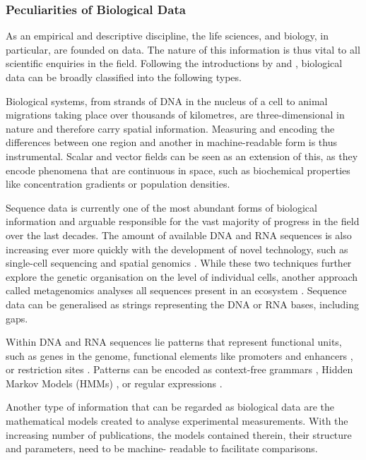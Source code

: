 \subsubsection{Peculiarities of Biological Data}\label{subsubsec:biodata}
As an empirical and descriptive discipline, the life sciences, and biology, in
particular, are founded on data. The nature of this information is thus vital
to all scientific enquiries in the field. Following the introductions by
\citet{Jagadish2003} and \citet{Wooley2006}, biological data can be broadly
classified into the following types.
\medbreak

\noindent
Biological\label{mar:dataspatial} systems, from
strands of DNA in the nucleus of a cell to animal migrations taking place over
thousands of kilometres, are three-dimensional in nature and therefore carry
spatial information. Measuring and encoding the differences between one region
and another in machine-readable form is thus instrumental. Scalar and vector
fields can be seen as an extension of this, as they encode phenomena that are
continuous in space, such as biochemical properties like concentration
gradients or population densities.
\medbreak

\noindent
Sequence data\label{mar:dataseq} is currently one of
the most abundant forms of biological information and arguable responsible for
the vast majority of progress in the field over the last decades. The amount
of available DNA and RNA sequences is also increasing ever more quickly with
the development of novel technology, such as single-cell sequencing \citep{%
Wang2015} and spatial genomics \citep{Turczyk2020}. While these two techniques
further explore the genetic organisation on the level of individual cells,
another approach called metagenomics analyses all sequences present in an
ecosystem \citep{Venter2004,Hugenholtz2008}. Sequence data can be generalised
as strings representing the DNA or RNA bases, including gaps.
\medbreak

\noindent
Within\label{mar:datapatterns} DNA and RNA sequences lie
patterns that represent functional units, such as genes in the genome,
functional elements like promoters and enhancers \citep{Kim2015a}, or
restriction sites \citep{Smith1976}. Patterns can be encoded as context-free
grammars \citep{Hopcroft2001}, Hidden Markov Models (HMMs) \citep{Stamp2021},
or regular expressions \citep{Wang2019}.
\medbreak

\noindent
Another\label{mar:datamodels} type of information that can
be regarded as biological data are the mathematical models created to analyse
experimental measurements. With the increasing number of publications, the
models contained therein, their structure and parameters, need to be machine-
readable to facilitate comparisons.
\medbreak


